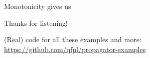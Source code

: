 \documentclass[UKenglish,usenames,dvipsnames,svgnames,table,aspectratio=169,mathserif]{beamer}
\newcommand{\nl}{\vspace{\baselineskip}}
\begin{document}
\begin{frame}
Monotonicity gives us 
\end{frame}










\begin{frame}
\huge \centering
Thanks for listening!
\nl

\large
(Real) code for all these examples and more:
\url{https://github.com/qfpl/propagator-examples}

\end{frame}
\end{document}
